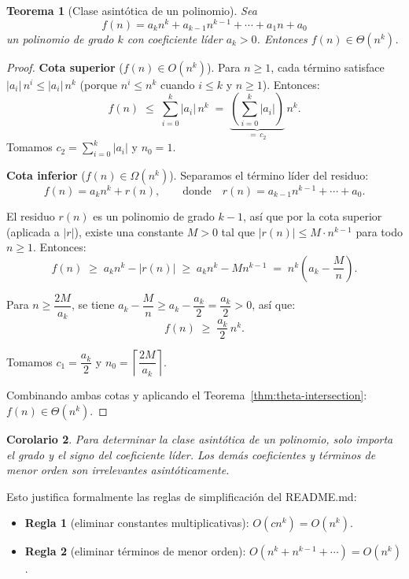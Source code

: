 \documentclass[11pt, letterpaper]{article}
\theoremstyle{definition}
\theoremstyle{plain}
\newtheorem{theorem}{Teorema}[section]
\newtheorem{corollary}[theorem]{Corolario}
\theoremstyle{remark}
\begin{document}
\begin{theorem}[Clase asintótica de un polinomio]\label{thm:poly}
  Sea
  \[
    f(n) = a_k n^k + a_{k-1} n^{k-1} + \cdots + a_1 n + a_0
  \]
  un polinomio de grado $k$ con coeficiente líder $a_k > 0$. Entonces
  $f(n) \in \Theta(n^k)$.
\end{theorem}

\begin{proof}
  \textbf{Cota superior} ($f(n) \in O(n^k)$).
  Para $n \geq 1$, cada término satisface $|a_i|\, n^i \leq |a_i|\, n^k$
  (porque $n^i \leq n^k$ cuando $i \leq k$ y $n \geq 1$). Entonces:
  \[
    f(n)
    \;\leq\; \sum_{i=0}^{k} |a_i|\, n^k
    \;=\; \underbrace{\left(\sum_{i=0}^{k} |a_i|\right)}_{=\, c_2}\, n^k.
  \]
  Tomamos $c_2 = \sum_{i=0}^{k} |a_i|$ y $n_0 = 1$.

  \medskip
  \textbf{Cota inferior} ($f(n) \in \Omega(n^k)$).
  Separamos el término líder del residuo:
  \[
    f(n) = a_k n^k + r(n),
    \qquad\text{donde}\quad
    r(n) = a_{k-1} n^{k-1} + \cdots + a_0.
  \]

  El residuo $r(n)$ es un polinomio de grado $k-1$, así que por la cota
  superior (aplicada a $|r|$), existe una constante $M > 0$ tal que
  $|r(n)| \leq M \cdot n^{k-1}$ para todo $n \geq 1$. Entonces:
  \[
    f(n) \;\geq\; a_k n^k - |r(n)|
         \;\geq\; a_k n^k - M n^{k-1}
         \;=\; n^k \!\left(a_k - \frac{M}{n}\right).
  \]

  Para $n \geq \dfrac{2M}{a_k}$, se tiene
  $a_k - \dfrac{M}{n} \geq a_k - \dfrac{a_k}{2} = \dfrac{a_k}{2} > 0$,
  así que:
  \[
    f(n) \;\geq\; \frac{a_k}{2}\, n^k.
  \]

  Tomamos $c_1 = \dfrac{a_k}{2}$ y
  $n_0 = \left\lceil \dfrac{2M}{a_k} \right\rceil$.

  \medskip
  Combinando ambas cotas y aplicando el Teorema~\ref{thm:theta-intersection}:
  $f(n) \in \Theta(n^k)$.
\end{proof}

\begin{corollary}
  Para determinar la clase asintótica de un polinomio, solo importa el
  grado y el signo del coeficiente líder. Los demás coeficientes y
  términos de menor orden son irrelevantes asintóticamente.
\end{corollary}

Esto justifica formalmente las reglas de simplificación del README.md:
\begin{itemize}[nosep]
  \item \textbf{Regla 1} (eliminar constantes multiplicativas):
        $O(cn^k) = O(n^k)$.
  \item \textbf{Regla 2} (eliminar términos de menor orden):
        $O(n^k + n^{k-1} + \cdots) = O(n^k)$.
\end{itemize}
\end{document}
